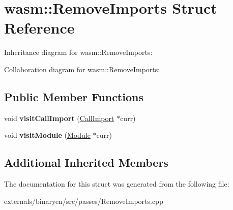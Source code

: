 \hypertarget{structwasm_1_1_remove_imports}{}\section{wasm\+:\+:Remove\+Imports Struct Reference}
\label{structwasm_1_1_remove_imports}


Inheritance diagram for wasm\+:\+:Remove\+Imports\+:


Collaboration diagram for wasm\+:\+:Remove\+Imports\+:
\subsection*{Public Member Functions}
\begin{DoxyCompactItemize}
\item 
\mbox{\label{structwasm_1_1_remove_imports_ab3676b589cad24722f14f926c5cfd31c}} 
void {\bfseries visit\+Call\+Import} (\mbox{\hyperlink{classwasm_1_1_call_import}{Call\+Import}} $\ast$curr)
\item 
\mbox{\label{structwasm_1_1_remove_imports_a06d7855f009c5bb1c99f02313a12f4c6}} 
void {\bfseries visit\+Module} (\mbox{\hyperlink{classwasm_1_1_module}{Module}} $\ast$curr)
\end{DoxyCompactItemize}
\subsection*{Additional Inherited Members}


The documentation for this struct was generated from the following file\+:\begin{DoxyCompactItemize}
\item 
externals/binaryen/src/passes/Remove\+Imports.\+cpp\end{DoxyCompactItemize}
